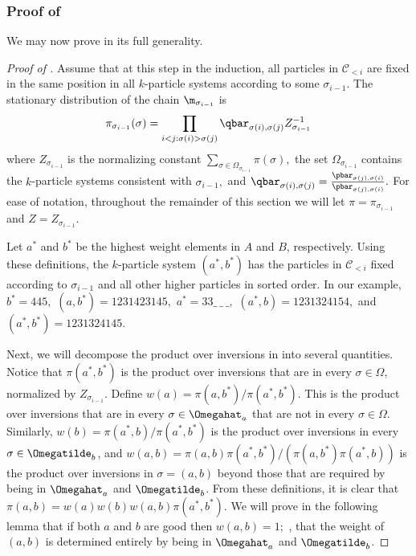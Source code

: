 \documentclass{toc}
\begin{document}
\subsubsection{Proof of }
We may now prove  in its full generality.\\

%
\begin{proof}[Proof of ]   %
Assume that at this step in the induction, all particles in 
$\mathcal{C}_{< i}$ are fixed in the same position in all $k$-particle 
systems according to some $\sigma_{i-1}.$  The stationary distribution 
of the chain $\m_{\sigma_{i-1}}$ is $$\pi_{\sigma_{i-1}}(\sigma) =  
\prod_{i < j: \sigma(i) > \sigma(j)}\qbar_{\sigma(i), 
\sigma(j)}Z_{\sigma_{i-1}}^{-1}$$  
where $Z_{\sigma_{i-1}}$ is the normalizing constant $\sum_{\sigma \in 
\Omega_{\sigma_{i-1}}} \pi(\sigma),$ the set $\Omega_{\sigma_{i-1}}$ 
contains the $k$-particle systems consistent with $\sigma_{i-1},$ and 
$\qbar_{\sigma(i), 
\sigma(j)}=\frac{\pbar_{\sigma(j),\sigma(i)}}{\pbar_{\sigma(j),\sigma(i)}}.$  
For ease of notation, throughout the remainder of this section we will 
let $\pi = \pi_{\sigma_{i-1}}$ and $Z =Z_{\sigma_{i-1}}$.

Let $a^*$ and $b^*$ be the highest weight elements in $A$ and $B$, 
respectively.  Using these definitions, the $k$-particle system 
$(a^*,b^*)$ has the particles in $\mathcal{C}_{< i}$ fixed according to 
$\sigma_{i-1}$ and all other higher particles in sorted order.   In our 
example, $b^* = 445,$ $(a,b^*) = 1231423145,$ $a^* = 33\_\ \_\ \_,$ 
$(a^*,b) = 1231324154,$ and $(a^*,b^*) = 1231324145.$ 

Next, we will decompose the product over inversions in 
 into several quantities. Notice that 
$\pi(a^*,b^*)$ is the product over inversions that are in every 
$\sigma\in\Omega$, normalized by $Z_{\sigma_{i-1}}$.  Define $w(a) = 
\pi(a,b^*)/\pi(a^*,b^*).$  This is the product over inversions that are 
in every $\sigma\in\Omegahat_a$ that are not in every 
$\sigma\in\Omega$. Similarly, $w(b) = \pi(a^*,b)/\pi(a^*,b^*)$ is the 
product over inversions in every $\sigma\in\Omegatilde_b$, and $w(a,b) 
= \pi(a,b) \pi(a^*,b^*)/ (\pi(a,b^*)\pi(a^*,b))$ is the product over 
inversions in $\sigma=(a,b)$ beyond those that are required by being in 
$\Omegahat_a$ and $\Omegatilde_b$.  From these definitions, it is clear 
that $\pi(a,b) = w(a)w(b) w(a,b)\pi(a^*,b^*).$  We will prove in the 
following lemma that if both $a$ and $b$ are good then $w(a,b) = 1;$ 
\ie,  that the weight of $(a,b)$ is determined entirely by being in 
$\Omegahat_a$ and $\Omegatilde_b$.


\end{proof}
\end{document}
